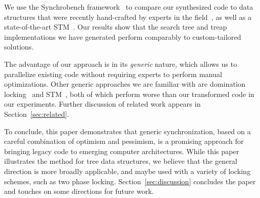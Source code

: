 We use the Synchrobench framework~\cite{Gramoli2015} to 
compare our synthesized code to data structures that were recently hand-crafted by experts in the field~\cite{DrachslerVY2014,BronsonCCO2010,ConcurrentSkipList,EllenFRB2010,CrainGR2013}, 
as well as a state-of-the-art STM~\cite{DiceSS2006}.
Our results show that the search tree and treap implementations we have generated
perform comparably to custom-tailored solutions.

%
The advantage of our approach is in its \emph{generic} nature, which allows us to parallelize existing code without requiring experts to perform
manual optimizations.
Other generic approaches we are familiar with are domination locking~\cite{Gueta2011} and STM~\cite{DBLP:conf/eurosys/ShalevS06}, both of which perform worse than our transformed code in our experiments. 
%
Further discussion of related work appears in Section~\ref{sec:related}.

To conclude, this paper demonstrates that generic synchronization, based on a careful combination of optimism and
pessimism, is a promising approach for bringing legacy code to emerging computer architectures.
While this paper illustrates the method for tree data structures, we believe that the general direction is more broadly applicable, and maybe used with a variety of locking schemes, such as two phase locking.
Section~\ref{sec:discussion} concludes the paper and touches on some directions for future work. 